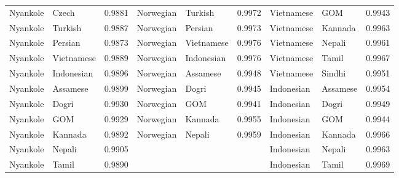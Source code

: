 \documentclass[11pt]{article} %
\begin{document}
\begin{table}
\begin{tabular}{llr@{\hspace{12pt}}llr@{\hspace{12pt}}llr}
            Nyankole                     & Czech               & 0.9881        & Norwegian           & Turkish             & 0.9972        & Vietnamese          & GOM                 & 0.9943        \\
            Nyankole                     & Turkish             & 0.9887        & Norwegian           & Persian             & 0.9973        & Vietnamese          & Kannada             & 0.9963        \\
            Nyankole                     & Persian             & 0.9873        & Norwegian           & Vietnamese          & 0.9976        & Vietnamese          & Nepali              & 0.9961        \\
            Nyankole                     & Vietnamese          & 0.9889        & Norwegian           & Indonesian          & 0.9976        & Vietnamese          & Tamil               & 0.9967        \\
            Nyankole                     & Indonesian          & 0.9896        & Norwegian           & Assamese            & 0.9948        & Vietnamese          & Sindhi              & 0.9951        \\
            Nyankole                     & Assamese            & 0.9899        & Norwegian           & Dogri               & 0.9945        & Indonesian          & Assamese            & 0.9954        \\
            Nyankole                     & Dogri               & 0.9930        & Norwegian           & GOM                 & 0.9941        & Indonesian          & Dogri               & 0.9949        \\
            Nyankole                     & GOM                 & 0.9929        & Norwegian           & Kannada             & 0.9955        & Indonesian          & GOM                 & 0.9944        \\
            Nyankole                     & Kannada             & 0.9892        & Norwegian           & Nepali              & 0.9959        & Indonesian          & Kannada             & 0.9966        \\
            Nyankole                     & Nepali              & 0.9905        &                     &                     &               & Indonesian          & Nepali              & 0.9963        \\
            Nyankole                     & Tamil               & 0.9890        &                     &                     &               & Indonesian          & Tamil               & 0.9969        \\

\end{tabular}
\end{table}
\end{document}
